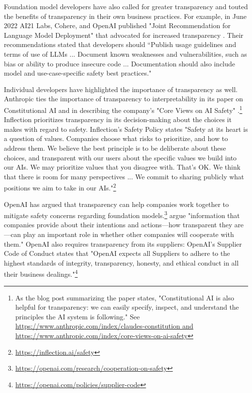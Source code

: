 \documentclass[screen, authorversion, acmsmall]{acmart}
\begin{document}
Foundation model developers have also called for greater transparency and touted the benefits of transparency in their own business practices. 
For example, in June 2022 AI21 Labs, Cohere, and OpenAI published "Joint Recommendation for Language Model Deployment" that advocated for increased transparency \citep{cohere2022}. 
Their recommendations stated that developers should “Publish usage guidelines and terms of use of LLMs ... Document known weaknesses and vulnerabilities, such as bias or ability to produce insecure code ... Documentation should also include model and use-case-specific safety best practices."

Individual developers have highlighted the importance of transparency as well. 
Anthropic ties the importance of transparency to interpretability in its paper on Constitutional AI and in describing the company's "Core Views on AI Safety" \citep{bai2022constitutional}.\footnote{As the blog post summarizing the paper states, "Constitutional AI is also helpful for transparency: we can easily specify, inspect, and understand the principles the AI system is following." See \url{https://www.anthropic.com/index/claudes-constitution and https://www.anthropic.com/index/core-views-on-ai-safety}} Inflection prioritizes transparency in its decision-making about the choices it makes with regard to safety. Inflection's Safety Policy states "Safety at its heart is a question of values. Companies choose what risks to prioritize, and how to address them. We believe the best principle is to be deliberate about these choices, and transparent with our users about the specific values we build into our AIs. We may prioritize values that you disagree with. That’s OK. We think that there is room for many perspectives ... We commit to sharing publicly what positions we aim to take in our AIs."\footnote{\url{https://inflection.ai/safety}}

OpenAI has argued that transparency can help companies work together to mitigate safety concerns regarding foundation models.\footnote{\url{https://openai.com/research/cooperation-on-safety}}
\citet{askell2019role} argue "information that companies provide about their intentions and actions—how transparent they are—can play an important role in whether other companies will cooperate with them."
OpenAI also requires transparency from its suppliers: OpenAI's Supplier Code of Conduct states that "OpenAI expects all Suppliers to adhere to the highest standards of integrity, transparency, honesty, and ethical conduct in all their business dealings."\footnote{\url{https://openai.com/policies/supplier-code}} 
\end{document}
